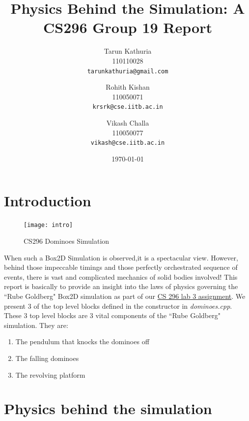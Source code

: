 \documentclass[11pt]{article}
\begin{document}
\title{Physics Behind the Simulation: A CS296 Group 19 Report}
\author{Tarun Kathuria \\ 110110028 \\ \texttt{tarunkathuria@gmail.com} \and Rohith Kishan \\ 110050071 \\ \texttt{krsrk@cse.iitb.ac.in} \and Vikash Challa \\ 110050077 \\ \texttt{vikash@cse.iitb.ac.in}}
\date{\today}
\maketitle

\section{Introduction}
\begin{figure}[h!]
\caption{CS296 Dominoes Simulation}
\centering
\texttt{[image: intro]}
\end{figure}
When such a Box2D Simulation is observed,it is a spectacular view.
However, behind those impeccable timings and those perfectly orchestrated sequence of events, there is vast and complicated mechanics of solid bodies involved!
This report is basically to provide an insight into the laws of physics governing the ``Rube Goldberg" Box2D simulation as part of our \underline{CS 296 lab 3 assignment}.
We present 3 of the top level blocks defined in the constructor in \emph{dominoes.cpp}. These 3 top level blocks are 3 vital components of the ``Rube Goldberg" simulation. They are: \\
\begin{enumerate}
\item The pendulum that knocks the dominoes off
\item The falling dominoes
\item The revolving platform

\end{enumerate}


\section{Physics behind the simulation}
\end{document}
